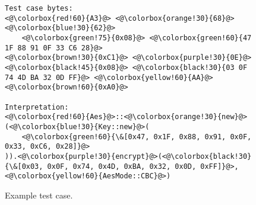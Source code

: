 \begin{figure}
    \centering
\begin{lstlisting}[numbers=none]
Test case bytes:
<@\colorbox{red!60}{A3}@> <@\colorbox{orange!30}{68}@> <@\colorbox{blue!30}{62}@> 
    <@\colorbox{green!75}{0x08}@> <@\colorbox{green!60}{47 1F 88 91 0F 33 C6 28}@> 
<@\colorbox{brown!30}{0xC1}@> <@\colorbox{purple!30}{0E}@> <@\colorbox{black!45}{0x08}@> <@\colorbox{black!30}{03 0F 74 4D BA 32 0D FF}@> <@\colorbox{yellow!60}{AA}@> 
<@\colorbox{brown!60}{0xA0}@>

Interpretation:
<@\colorbox{red!60}{Aes}@>::<@\colorbox{orange!30}{new}@>(<@\colorbox{blue!30}{Key::new}@>(
    <@\colorbox{green!60}{\&[0x47, 0x1F, 0x88, 0x91, 0x0F, 0x33, 0xC6, 0x28]}@>
)).<@\colorbox{purple!30}{encrypt}@>(<@\colorbox{black!30}{\&[0x03, 0x0F, 0x74, 0x4D, 0xBA, 0x32, 0x0D, 0xFF]}@>, <@\colorbox{yellow!60}{AesMode::CBC}@>)
\end{lstlisting}

    \caption{Example test case.}
    \label{fig:tcxd}
\end{figure}
    

%


